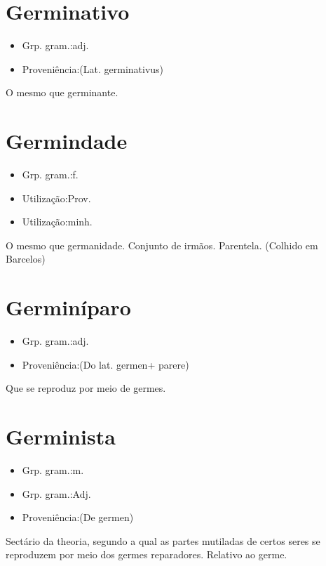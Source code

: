 \section{Germinativo}
\begin{itemize}
\item {Grp. gram.:adj.}
\end{itemize}
\begin{itemize}
\item {Proveniência:(Lat. \textunderscore germinativus\textunderscore )}
\end{itemize}
O mesmo que \textunderscore germinante\textunderscore .
\section{Germindade}
\begin{itemize}
\item {Grp. gram.:f.}
\end{itemize}
\begin{itemize}
\item {Utilização:Prov.}
\end{itemize}
\begin{itemize}
\item {Utilização:minh.}
\end{itemize}
O mesmo que \textunderscore germanidade\textunderscore .
Conjunto de irmãos.
Parentela. (Colhido em Barcelos)
\section{Germiníparo}
\begin{itemize}
\item {Grp. gram.:adj.}
\end{itemize}
\begin{itemize}
\item {Proveniência:(Do lat. \textunderscore germen\textunderscore  + \textunderscore parere\textunderscore )}
\end{itemize}
Que se reproduz por meio de germes.
\section{Germinista}
\begin{itemize}
\item {Grp. gram.:m.}
\end{itemize}
\begin{itemize}
\item {Grp. gram.:Adj.}
\end{itemize}
\begin{itemize}
\item {Proveniência:(De \textunderscore germen\textunderscore )}
\end{itemize}
Sectário da theoria, segundo a qual as partes mutiladas de certos seres se reproduzem por meio dos germes reparadores.
Relativo ao germe.
